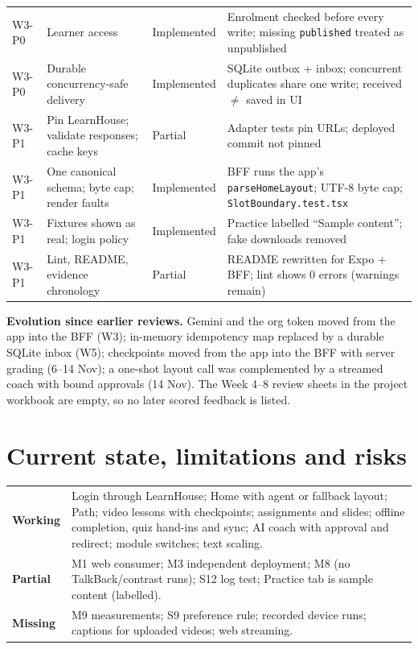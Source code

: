 \documentclass[11pt,a4paper]{article}
\newcommand{\fp}[1]{\nolinkurl{#1}}
\begin{document}
\begin{xltabular}{\textwidth}{L{0.12\textwidth}L{0.25\textwidth}L{0.13\textwidth}Y}
W3-P0 & Learner access & Implemented & Enrolment checked before every write; missing \texttt{published} treated as unpublished \\
W3-P0 & Durable concurrency-safe delivery & Implemented & SQLite outbox + inbox; concurrent duplicates share one write; received $\ne$ saved in UI \\
W3-P1 & Pin LearnHouse; validate responses; cache keys & Partial & Adapter tests pin URLs; deployed commit not pinned \\
W3-P1 & One canonical schema; byte cap; render faults & Implemented & BFF runs the app's \texttt{parseHomeLayout}; UTF-8 byte cap; \fp{SlotBoundary.test.tsx} \\
W3-P1 & Fixtures shown as real; login policy & Implemented & Practice labelled ``Sample content''; fake downloads removed \\
W3-P1 & Lint, README, evidence chronology & Partial & README rewritten for Expo + BFF; lint shows 0 errors (warnings remain) \\
\bottomrule
\end{xltabular}
\textbf{Evolution since earlier reviews.} Gemini and the org token moved from the app into the BFF
(W3); in-memory idempotency map replaced by a durable SQLite inbox (W5); checkpoints moved from the
app into the BFF with server grading (6–14 Nov); a one-shot layout call was complemented by a
streamed coach with bound approvals (14 Nov). The Week 4–8 review sheets in the project workbook are
empty, so no later scored feedback is listed.

\section{Current state, limitations and risks}
\begin{xltabular}{\textwidth}{L{0.14\textwidth}Y}
\toprule
\textbf{Working} & Login through LearnHouse; Home with agent or fallback layout; Path; video lessons with checkpoints; assignments and slides; offline completion, quiz hand-ins and sync; AI coach with approval and redirect; module switches; text scaling. \\
\textbf{Partial} & M1 web consumer; M3 independent deployment; M8 (no TalkBack/contrast runs); S12 log test; Practice tab is sample content (labelled). \\
\textbf{Missing} & M9 measurements; S9 preference rule; recorded device runs; captions for uploaded videos; web streaming. \\
\bottomrule
\end{xltabular}
\end{document}

